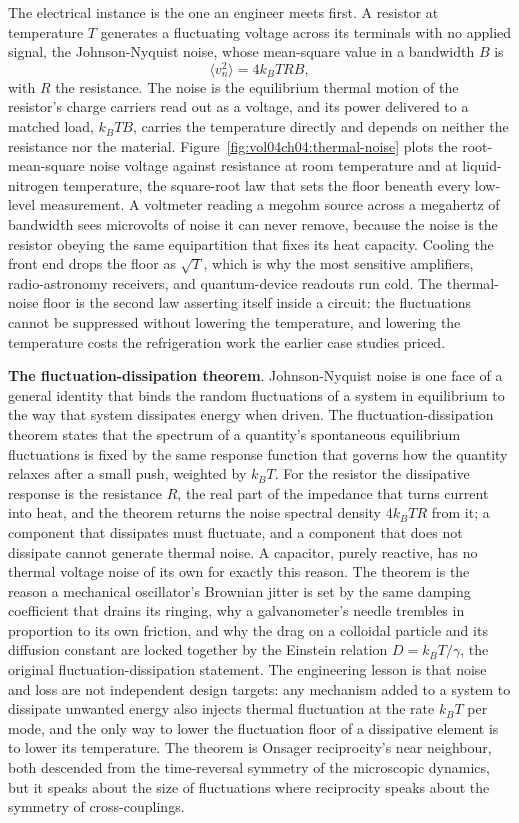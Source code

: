 The electrical instance is the one an engineer meets first. A resistor at
temperature $T$ generates a fluctuating voltage across its terminals with no
applied signal, the Johnson-Nyquist noise, whose mean-square value in a
bandwidth $B$ is
\[
\langle v_n^2\rangle = 4 k_B T R B,
\]
with $R$ the resistance. The noise is the equilibrium thermal motion of the
resistor's charge carriers read out as a voltage, and its power delivered to
a matched load, $k_B T B$, carries the temperature directly and depends on
neither the resistance nor the material. Figure~\ref{fig:vol04ch04:thermal-noise}
plots the root-mean-square noise voltage against resistance at room
temperature and at liquid-nitrogen temperature, the square-root law that sets
the floor beneath every low-level measurement. A voltmeter reading a megohm
source across a megahertz of bandwidth sees microvolts of noise it can never
remove, because the noise is the resistor obeying the same equipartition that
fixes its heat capacity. Cooling the front end drops the floor as
$\sqrt{T}$, which is why the most sensitive amplifiers, radio-astronomy
receivers, and quantum-device readouts run cold. The thermal-noise floor is
the second law asserting itself inside a circuit: the fluctuations cannot be
suppressed without lowering the temperature, and lowering the temperature
costs the refrigeration work the earlier case studies priced.

\begin{mastery}
\textbf{The fluctuation-dissipation theorem}. Johnson-Nyquist noise is one
face of a general identity that binds the random fluctuations of a system in
equilibrium to the way that system dissipates energy when driven. The
fluctuation-dissipation theorem states that the spectrum of a quantity's
spontaneous equilibrium fluctuations is fixed by the same response function
that governs how the quantity relaxes after a small push, weighted by $k_B T$.
For the resistor the dissipative response is the resistance $R$, the real
part of the impedance that turns current into heat, and the theorem returns
the noise spectral density $4 k_B T R$ from it; a component that dissipates
must fluctuate, and a component that does not dissipate cannot generate
thermal noise. A capacitor, purely reactive, has no thermal voltage noise of
its own for exactly this reason. The theorem is the reason a mechanical
oscillator's Brownian jitter is set by the same damping coefficient that
drains its ringing, why a galvanometer's needle trembles in proportion to its
own friction, and why the drag on a colloidal particle and its diffusion
constant are locked together by the Einstein relation $D = k_B T/\gamma$, the
original fluctuation-dissipation statement. The engineering lesson is that
noise and loss are not independent design targets: any mechanism added to a
system to dissipate unwanted energy also injects thermal fluctuation at the
rate $k_B T$ per mode, and the only way to lower the fluctuation floor of a
dissipative element is to lower its temperature. The theorem is Onsager
reciprocity's near neighbour, both descended from the time-reversal symmetry
of the microscopic dynamics, but it speaks about the size of fluctuations
where reciprocity speaks about the symmetry of cross-couplings.
\end{mastery}

